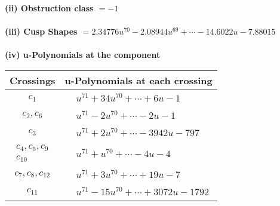 \documentclass[1p]{elsarticle_modified}
\theoremstyle{definition}
\begin{document}
\flushleft \textbf{(ii) Obstruction class $= -1$}\\~\\
\flushleft \textbf{(iii) Cusp Shapes $= 2.34776 u^{70}-2.08944 u^{69}+\cdots-14.6022 u-7.88015$}\\~\\
\newpage\renewcommand{\arraystretch}{1}
\flushleft \textbf{(iv) u-Polynomials at the component}\newline \\
\begin{tabular}{m{50pt}|m{274pt}}
Crossings & \hspace{64pt}u-Polynomials at each crossing \\
\hline $$\begin{aligned}c_{1}\end{aligned}$$&$\begin{aligned}
&u^{71}+34 u^{70}+\cdots+6 u-1
\end{aligned}$\\
\hline $$\begin{aligned}c_{2},c_{6}\end{aligned}$$&$\begin{aligned}
&u^{71}-2 u^{70}+\cdots-2 u-1
\end{aligned}$\\
\hline $$\begin{aligned}c_{3}\end{aligned}$$&$\begin{aligned}
&u^{71}+2 u^{70}+\cdots-3942 u-797
\end{aligned}$\\
\hline $$\begin{aligned}c_{4},c_{5},c_{9}\\c_{10}\end{aligned}$$&$\begin{aligned}
&u^{71}+u^{70}+\cdots-4 u-4
\end{aligned}$\\
\hline $$\begin{aligned}c_{7},c_{8},c_{12}\end{aligned}$$&$\begin{aligned}
&u^{71}+3 u^{70}+\cdots+19 u-7
\end{aligned}$\\
\hline $$\begin{aligned}c_{11}\end{aligned}$$&$\begin{aligned}
&u^{71}-15 u^{70}+\cdots+3072 u-1792
\end{aligned}$\\
\hline
\end{tabular}\\~\\
\end{document}
